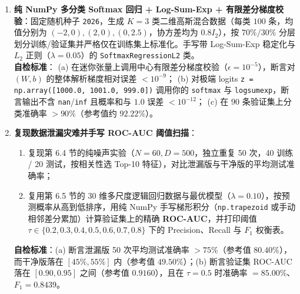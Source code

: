 \begin{enumerate}[label=\textbf{6.\arabic*}, resume]
  \item \textbf{纯 NumPy 多分类 Softmax 回归 + Log-Sum-Exp + 有限差分梯度校验}：固定随机种子 \texttt{2026}，生成 $K=3$ 类二维高斯混合数据（每类 $100$ 条，均值分别为 $(-2,0), (2,0), (0, 2.5)$，协方差均为 $0.8 I_2$），按 $70\%/30\%$ 分层划分训练/验证集并严格仅在训练集上标准化。手写带 Log-Sum-Exp 稳定化与 $L_2$ 正则（$\lambda = 0.05$）的 \texttt{SoftmaxRegressionL2} 类。\\
  \textbf{自检标准}：
  (a) 在迷你张量上调用中心有限差分梯度校验（$\epsilon = 10^{-5}$），断言对 $(W, b)$ 的整体解析梯度相对误差 $< 10^{-9}$；
  (b) 对极端 logits \texttt{z = np.array([1000.0, 1001.0, 999.0])} 调用你的 \texttt{softmax} 与 \texttt{logsumexp}，断言输出不含 \texttt{nan}/\texttt{inf} 且概率和与 $1.0$ 误差 $< 10^{-12}$；
  (c) 在 $90$ 条验证集上分类准确率 $> 90\%$（参考值约 $92.22\%$）。

  \item \textbf{复现数据泄漏灾难并手写 ROC-AUC 阈值扫描}：
  \begin{enumerate}[label=(\alph*)]
    \item 复现第 6.4 节的纯噪声实验（$N=60, D=500$，独立重复 50 次，40 训练 / 20 测试，按相关性选 Top-10 特征），对比泄漏版与干净版的平均测试准确率；
    \item 复用第 6.5 节的 30 维多尺度逻辑回归数据与最优模型（$\lambda = 0.10$），按预测概率从高到低排序，用纯 NumPy 手写梯形积分（\texttt{np.trapezoid} 或手动相邻差分累加）计算验证集上的精确 \textbf{ROC-AUC}，并打印阈值 $\tau \in \{0.2, 0.3, 0.4, 0.5, 0.6, 0.7, 0.8\}$ 下的 Precision、Recall 与 $F_1$ 权衡表。
  \end{enumerate}
  \textbf{自检标准}：(a) 断言泄漏版 50 次平均测试准确率 $> 75\%$（参考值 $80.40\%$），而干净版落在 $[45\%, 55\%]$ 内（参考值 $49.50\%$）；(b) 断言验证集 ROC-AUC 落在 $[0.90, 0.95]$ 之间（参考值 $0.9160$），且在 $\tau = 0.5$ 时准确率 $= 85.00\%$、$F_1 = 0.8439$。
\end{enumerate}

